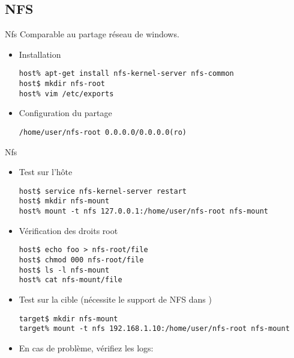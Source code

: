 \subsection{NFS}

\begin{frame}[fragile=singleslide]{Nfs}
  Comparable au partage réseau de windows.
  \begin{itemize}
  \item Installation
    \begin{lstlisting}
host% apt-get install nfs-kernel-server nfs-common
host$ mkdir nfs-root 
host% vim /etc/exports
    \end{lstlisting} %
  \item Configuration du partage
    \begin{lstlisting}
/home/user/nfs-root 0.0.0.0/0.0.0.0(ro)
    \end{lstlisting}
  \end{itemize}
\end{frame}

\begin{frame}[fragile=singleslide]{Nfs}
  \begin{itemize}
    \item Test sur l'hôte
      \begin{lstlisting}
host$ service nfs-kernel-server restart
host$ mkdir nfs-mount
host% mount -t nfs 127.0.0.1:/home/user/nfs-root nfs-mount
      \end{lstlisting} %
    \item Vérification des droits root
      \begin{lstlisting}
host$ echo foo > nfs-root/file
host$ chmod 000 nfs-root/file
host$ ls -l nfs-mount
host% cat nfs-mount/file
      \end{lstlisting} %
     \item Test sur la cible (nécessite le support de NFS dans )
       \begin{lstlisting}
target$ mkdir nfs-mount
target% mount -t nfs 192.168.1.10:/home/user/nfs-root nfs-mount
       \end{lstlisting} %
     \item En cas de problème, vérifiez les logs: 
   \end{itemize}
\end{frame}  

